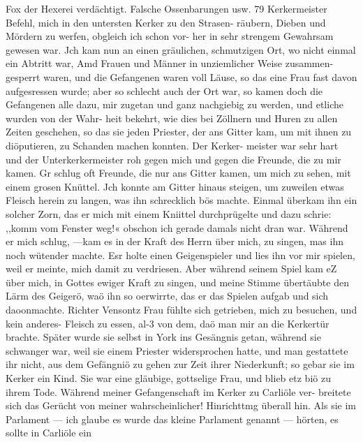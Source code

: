 Fox der Hexerei verdächtigt. Falsche Ossenbarungen usw. 79
Kerkermeister Befehl, mich in den untersten Kerker zu den Strasen-
räubern, Dieben und Mördern zu werfen, obgleich ich schon vor-
her in sehr strengem Gewahrsam gewesen war. Jch kam nun
an einen gräulichen, schmutzigen Ort, wo nicht einmal ein Abtritt
war, Amd Frauen und Männer in unziemlicher Weise zusammen-
gesperrt waren, und die Gefangenen waren voll Läuse, so das eine
Frau fast davon aufgesressen wurde; aber so schlecht auch der
Ort war, so kamen doch die Gefangenen alle dazu, mir zugetan
und ganz nachgiebig zu werden, und etliche wurden von der Wahr-
heit bekehrt, wie dies bei Zöllnern und Huren zu allen Zeiten
geschehen, so das sie jeden Priester, der ans Gitter kam, um mit
ihnen zu diöputieren, zu Schanden machen konnten. Der Kerker-
meister war sehr hart und der Unterkerkermeister roh gegen mich und
gegen die Freunde, die zu mir kamen. Gr schlug oft Freunde,
die nur ans Gitter kamen, um mich zu sehen, mit einem grosen
Knüttel. Jch konnte am Gitter hinaus steigen, um zuweilen etwas
Fleisch herein zu langen, was ihn schrecklich bös machte. Einmal
überkam ihn ein solcher Zorn, das er mich mit einem Kniittel
durchprügelte und dazu schrie: ,,komm vom Fenster weg!« obschon
ich gerade damals nicht dran war. Während er mich schlug,
—kam es in der Kraft des Herrn über mich, zu singen, mas ihn
noch wütender machte. Esr holte einen Geigenspieler und lies
ihn vor mir spielen, weil er meinte, mich damit zu verdriesen.
Aber während seinem Spiel kam eZ über mich, in Gottes ewiger
Kraft zu singen, und meine Stimme übertäubte den Lärm des
Geigerö, waö ihn so oerwirrte, das er das Spielen aufgab und
sich daoonmachte.
Richter Vensontz Frau fühlte sich getrieben, mich zu besuchen,
und kein anderes- Fleisch zu essen, al-3 von dem, daö man mir
an die Kerkertür brachte. Später wurde sie selbst in York ins
Gesängnis getan, während sie schwanger war, weil sie einem
Priester widersprochen hatte, und man gestattete ihr nicht, aus
dem Gefängniö zu gehen zur Zeit ihrer Niederkunft; so gebar
sie im Kerker ein Kind. Sie war eine gläubige, gottselige Frau,
und blieb etz biö zu ihrem Tode.
Während meiner Gefangenschaft im Kerker zu Carliöle ver-
breitete sich das Gerücht von meiner wahrscheinlicher! Hinrichttmg
überall hin. Als sie im Parlament — ich glaube es wurde das
kleine Parlament genannt — hörten, es sollte in Carliöle ein


